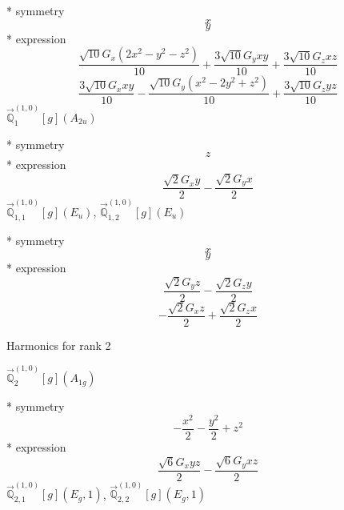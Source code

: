 \documentclass[fleqn,8pt]{jsarticle}
\begin{document}
\noindent\quad ** symmetry
\begin{dmath*}
x
\end{dmath*}
\begin{dmath*}
y
\end{dmath*}
\noindent\quad ** expression
\begin{dmath*}
\frac{\sqrt{10} G_{x} \left(2 x^{2} - y^{2} - z^{2}\right)}{10} + \frac{3 \sqrt{10} G_{y} x y}{10} + \frac{3 \sqrt{10} G_{z} x z}{10}
\end{dmath*}
\begin{dmath*}
\frac{3 \sqrt{10} G_{x} x y}{10} - \frac{\sqrt{10} G_{y} \left(x^{2} - 2 y^{2} + z^{2}\right)}{10} + \frac{3 \sqrt{10} G_{z} y z}{10}
\end{dmath*}
\noindent\quad $\vec{\mathbb{Q}}_{1}^{(1,0)}[g](A_{2u})$

\noindent\quad ** symmetry
\begin{dmath*}
z
\end{dmath*}
\noindent\quad ** expression
\begin{dmath*}
\frac{\sqrt{2} G_{x} y}{2} - \frac{\sqrt{2} G_{y} x}{2}
\end{dmath*}
\noindent\quad $\vec{\mathbb{Q}}_{1,1}^{(1,0)}[g](E_{u})$, $\vec{\mathbb{Q}}_{1,2}^{(1,0)}[g](E_{u})$

\noindent\quad ** symmetry
\begin{dmath*}
x
\end{dmath*}
\begin{dmath*}
y
\end{dmath*}
\noindent\quad ** expression
\begin{dmath*}
\frac{\sqrt{2} G_{y} z}{2} - \frac{\sqrt{2} G_{z} y}{2}
\end{dmath*}
\begin{dmath*}
- \frac{\sqrt{2} G_{x} z}{2} + \frac{\sqrt{2} G_{z} x}{2}
\end{dmath*}

\noindent * Harmonics for rank 2

\noindent\quad $\vec{\mathbb{Q}}_{2}^{(1,0)}[g](A_{1g})$

\noindent\quad ** symmetry
\begin{dmath*}
- \frac{x^{2}}{2} - \frac{y^{2}}{2} + z^{2}
\end{dmath*}
\noindent\quad ** expression
\begin{dmath*}
\frac{\sqrt{6} G_{x} y z}{2} - \frac{\sqrt{6} G_{y} x z}{2}
\end{dmath*}
\noindent\quad $\vec{\mathbb{Q}}_{2,1}^{(1,0)}[g](E_{g},1)$, $\vec{\mathbb{Q}}_{2,2}^{(1,0)}[g](E_{g},1)$
\end{document}
